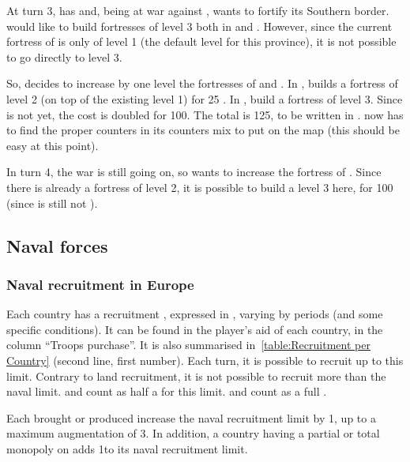 \begin{exemple}
  At turn 3, \FRA has \TREN and, being at war against \HIS, wants to fortify
  its Southern border. \FRA would like to build fortresses of level 3 both in
  \provinceBearn and \provinceLanguedoc. However, since the current fortress
  of \provinceLanguedoc is only of level 1 (the default level for this
  province), it is not possible to go directly to level 3.

  So, \FRA decides to increase by one level the fortresses of \provinceBearn
  and \provinceLanguedoc. In \provinceLanguedoc, \FRA builds a fortress of
  level 2 (on top of the existing level 1) for 25 \ducats. In \provinceBearn,
  \FRA build a fortress of level 3. Since \FRA is not \TARQ yet, the cost is
  doubled for 100\ducats. The total is 125\ducats, to be written in
  . \FRA now has to find the proper counters in
  its counters mix to put on the map (this should be easy at this point).

  In turn 4, the war is still going on, so \FRA wants to increase the fortress
  of \provinceLanguedoc. Since there is already a fortress of level 2, it is
  possible to build a level 3 here, for 100 \ducats (since \FRA is still not
  \TARQ).
\end{exemple}

\subsection{Naval forces}\label{chLogistic:Naval Purchase}
\subsubsection{Naval recruitment in Europe}
\aparag[Limit]
\bparag Each country has a recruitment , expressed in \ND,
varying by periods (and some specific conditions).
\bparag It can be found in the player's aid of each country, in the column
``Troops purchase''.
\bparag It is also summarised in~\ref{table:Recruitment per Country} (second
line, first number).
\bparag Each turn, it is possible to recruit up to this limit. Contrary to
land recruitment, it is not possible to recruit more than the naval
limit.
\bparag \NGD and \NDE count as half a \ND for this limit. \NTD and \VGD count
as a full \ND.

\label{chLogistic:Effect of Wood Purchase}
\label{chLogistic:Effect of Fish Monopoly Purchase}
\bparag Each  brought or produced increase the naval recruitment
limit by 1\ND, up to a maximum augmentation of 3\ND.
\bparag In addition, a country having a partial or total monopoly on
 adds 1\ND to its naval recruitment limit.

